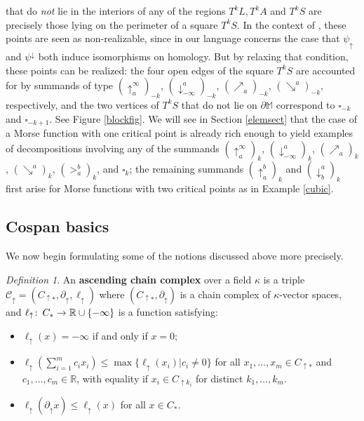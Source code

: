 \documentclass[11pt]{amsart}
\theoremstyle{definition}
\theoremstyle{remark}
\newtheorem{dfn}[theorem]{Definition}
\numberwithin{equation}{section}
\def\co{\colon\thinspace}
\def\R{\mathbb{R}}
\begin{document}
that do \emph{not} lie in the interiors of any of the regions $T^kL,T^kA$ and $T^kS$ are precisely those lying on the perimeter of a square $T^kS$.  In the context of \cite{BBF20}, these points are seen as non-realizable, since in our language \cite{BBF20} concerns the case that $\psi_{\uparrow}$ and $\psi^{\downarrow}$ both induce isomorphisms on homology.  But by relaxing that condition, these points can be realized: the four open edges of the square $T^kS$ are accounted for by summands of type $(\uparrow_{a}^{\infty})_{-k}$, $(\downarrow^a_{-\infty})_{-k}$, $(\nearrow_a)_{-k}$, $(\searrow^a)_{-k}$, respectively, and the two vertices of $T^kS$ that do not lie on $\partial\mathbb{M}$ correspond to $\square_{-k}$ and $\square_{-k+1}$.  See Figure \ref{blockfig}.  We will see in Section \ref{elemsect} that the case of a Morse function with one critical point is already rich enough to yield examples of decompositions involving any of the summands $(\uparrow_{a}^{\infty})_k$, $(\downarrow^a_{-\infty})_k$, $(\nearrow_a)_k$, $(\searrow^a)_k$, $(>_a^b)_k$, and $\square_k$;  the remaining summands $(\uparrow_a^b)_k$ and $(\downarrow^a_b)_k$ first arise for Morse functions with two critical points as in Example \ref{cubic}.

\subsection{Cospan basics}
We now begin formulating some of the notions discussed above more precisely.
	
	\begin{dfn}\label{ascdef}
		 An \textbf{ascending chain complex} over a field $\kappa$ is a triple $\mathcal{C}_{\uparrow}=(C_{\uparrow*},\partial_{\uparrow},\ell_{\uparrow})$ where $(C_{\uparrow*},\partial_{\uparrow})$ is a chain complex of $\kappa$-vector spaces, and $\ell_{\uparrow}\co C_*\to  \R\cup\{-\infty\}$ is a function satisfying:
		\begin{itemize} \item $\ell_{\uparrow}(x)=-\infty$ if and only if $x=0$;%
			\item $\ell_{\uparrow}\left(\sum_{i=1}^{m}c_ix_i\right)\leq \max\{\ell_{\uparrow}(x_i)|c_i\neq 0\}$ for all $x_1,\ldots,x_m\in C_{\uparrow*}$ and $c_1,\ldots,c_m\in\R$, with equality if $x_i\in C_{\uparrow k_i}$ for distinct $k_1,\ldots,k_m$.
			\item $\ell_{\uparrow}(\partial_{\uparrow}x)\leq \ell_{\uparrow}(x)$ for all $x\in C_*$. 
		\end{itemize}
	\end{dfn}
	
\end{document}
